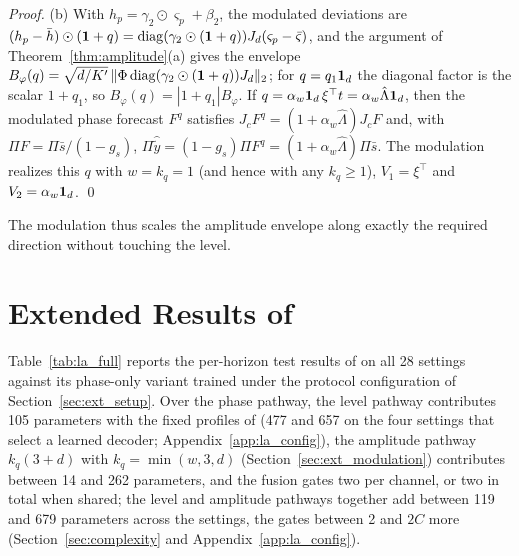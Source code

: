 {\begin{proof}
(b) With $h_p=\gamma_2\odot\varsigma_p+\beta_2$, the modulated deviations are $(h_p-\bar h)\odot(\mathbf 1+q)=\operatorname{diag}(\gamma_2\odot(\mathbf 1+q))J_d(\varsigma_p-\bar\varsigma)$, and the argument of Theorem~\ref{thm:amplitude}(a) gives the envelope $B_\varphi(q)=\sqrt{d/K'}\,\|\Phi\operatorname{diag}(\gamma_2\odot(\mathbf 1+q))J_d\|_2$; for $q=q_1\mathbf 1_d$ the diagonal factor is the scalar $1+q_1$, so $B_\varphi(q)=|1+q_1|B_\varphi$. If $q=\alpha_w\mathbf 1_d\,\xi^\top t=\alpha_w\hat\Lambda\mathbf 1_d$, then the modulated phase forecast $F^{q}$ satisfies $J_cF^{q}=(1+\alpha_w\hat\Lambda)J_cF$ and, with $\Pi F=\Pi\bar s/(1-g_s)$, $\Pi\hat{\tilde y}=(1-g_s)\Pi F^{q}=(1+\alpha_w\hat\Lambda)\Pi\bar s$. The modulation~ realizes this $q$ with $w=k_q=1$ (and hence with any $k_q\ge1$), $V_1=\xi^\top$ and $V_2=\alpha_w\mathbf 1_d$. \qed
\end{proof}

The modulation thus scales the amplitude envelope along exactly the required direction without touching the level.

\section{Extended Results of \sysplus}
\label{app:ext_results}

Table~\ref{tab:la_full} reports the per-horizon test results of \sysplus on all 28 settings against its phase-only variant trained under the protocol configuration of Section~\ref{sec:ext_setup}. Over the phase pathway, the level pathway contributes 105 parameters with the fixed profiles of  (477 and 657 on the four settings that select a learned decoder; Appendix~\ref{app:la_config}), the amplitude pathway $k_q(3+d)$ with $k_q=\min(w,3,d)$ (Section~\ref{sec:ext_modulation}) contributes between 14 and 262 parameters, and the fusion gates two per channel, or two in total when shared; the level and amplitude pathways together add between 119 and 679 parameters across the settings, the gates between 2 and $2C$ more (Section~\ref{sec:complexity} and Appendix~\ref{app:la_config}).


}

